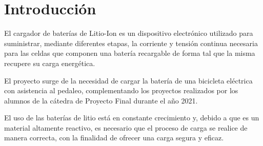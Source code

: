 \section{Introducción}






El cargador de baterías de Litio-Ion es un dispositivo electrónico utilizado para suministrar, mediante diferentes etapas, la corriente y tensión continua necesaria para las celdas que componen una batería recargable de forma tal que la misma recupere su carga energética.

El proyecto surge de la necesidad de cargar la batería de una bicicleta eléctrica con asistencia al pedaleo,
complementando los proyectos realizados por los alumnos de la cátedra de Proyecto Final durante el año 2021.

El uso de las baterías de litio está en constante crecimiento y,
debido a que es un material altamente reactivo,
es necesario que el proceso de carga se realice de manera correcta,
con la finalidad de ofrecer una carga segura y eficaz.